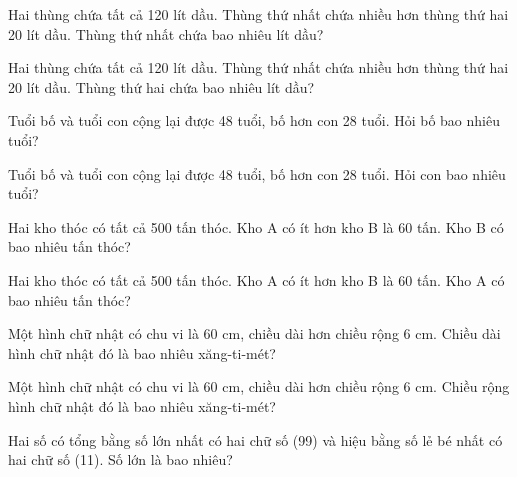 \begin{ex}
Hai thùng chứa tất cả 120 lít dầu. Thùng thứ nhất chứa nhiều hơn thùng thứ hai 20 lít dầu. Thùng thứ nhất chứa bao nhiêu lít dầu?
\end{ex}

\begin{ex}
Hai thùng chứa tất cả 120 lít dầu. Thùng thứ nhất chứa nhiều hơn thùng thứ hai 20 lít dầu. Thùng thứ hai chứa bao nhiêu lít dầu?
\end{ex}

\begin{ex}
Tuổi bố và tuổi con cộng lại được 48 tuổi, bố hơn con 28 tuổi. Hỏi bố bao nhiêu tuổi?
\end{ex}

\begin{ex}
Tuổi bố và tuổi con cộng lại được 48 tuổi, bố hơn con 28 tuổi. Hỏi con bao nhiêu tuổi?
\end{ex}

\begin{ex}
Hai kho thóc có tất cả 500 tấn thóc. Kho A có ít hơn kho B là 60 tấn. Kho B có bao nhiêu tấn thóc?
\end{ex}

\begin{ex}
Hai kho thóc có tất cả 500 tấn thóc. Kho A có ít hơn kho B là 60 tấn. Kho A có bao nhiêu tấn thóc?
\end{ex}

\begin{ex}
Một hình chữ nhật có chu vi là 60 cm, chiều dài hơn chiều rộng 6 cm. Chiều dài hình chữ nhật đó là bao nhiêu xăng-ti-mét?
\end{ex}

\begin{ex}
Một hình chữ nhật có chu vi là 60 cm, chiều dài hơn chiều rộng 6 cm. Chiều rộng hình chữ nhật đó là bao nhiêu xăng-ti-mét?
\end{ex}

\begin{ex}
Hai số có tổng bằng số lớn nhất có hai chữ số (99) và hiệu bằng số lẻ bé nhất có hai chữ số (11). Số lớn là bao nhiêu?
\end{ex}

